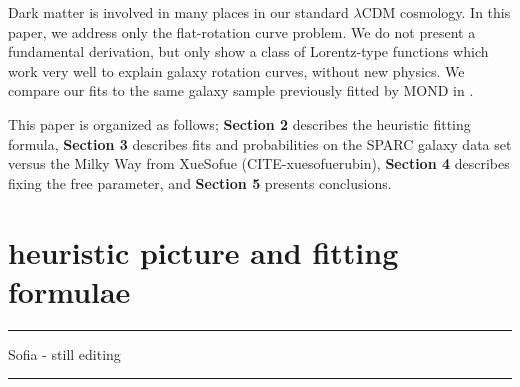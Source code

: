 \documentclass[reprint,%
 amsmath,amssymb,
 aps,
]{revtex4-1}
\begin{document}
 
   
   
Dark matter is   involved in many places in our   standard $\lambda$CDM cosmology. In  this paper, we   address only the flat-rotation curve problem.      We do not present a fundamental derivation, but only  show  a class of  Lorentz-type functions  which work very well to  explain galaxy rotation curves,  without   new physics.    We compare our fits to the same galaxy sample previously fitted by     MOND   in   \cite{2016Lelli}.
   
   
 
   
 
This paper  is organized as follows;
{\bf Section 2} describes the heuristic  fitting formula, 
{\bf Section 3} describes fits and probabilities on the
 SPARC galaxy data set versus    the Milky Way from  XueSofue (CITE-xuesofuerubin), 
 {\bf Section 4} describes fixing the free parameter,   and   
{\bf Section 5}  presents conclusions.     

 
 
  
 
\section{  heuristic picture and fitting formulae  \label{sec:dos}}
 {\color{teal} \rule{\linewidth}{0.5mm}}
 
 {\color{teal}Sofia - still editing}
 {\color{teal} \rule{\linewidth}{0.5mm}}
 
\end{document}
